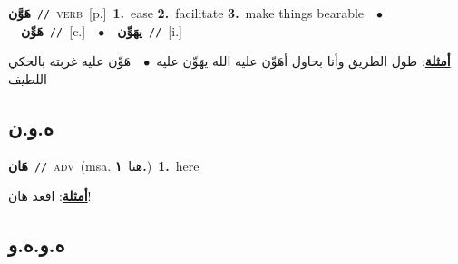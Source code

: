 \documentclass[10pt,a4paper,twoside]{article} %
\begin{document}
\begin{multicols}{2}
{\setlength\topsep{0pt}\textbf{\foreignlanguage{arabic}{هَوَّن}}\ {\color{gray}\texttt{//}\color{black}}\ \textsc{verb}\ [p.]\ \textbf{1.}~ease  \textbf{2.}~facilitate  \textbf{3.}~make things bearable\ \ $\bullet$\ \ \setlength\topsep{0pt}\textbf{\foreignlanguage{arabic}{هَوِّن}}\ {\color{gray}\texttt{//}\color{black}}\ [c.]\ \ $\bullet$\ \ \setlength\topsep{0pt}\textbf{\foreignlanguage{arabic}{يهَوِّن}}\ {\color{gray}\texttt{//}\color{black}}\ [i.]\  \begin{flushright}\color{gray}\foreignlanguage{arabic}{\textbf{\underline{\foreignlanguage{arabic}{أمثلة}}}: طول الطريق وأنا بحاول أهَوِّن عليه الله يهَوِّن عليه\ $\bullet$\ \  هَوِّن عليه غربته بالحكي اللطيف}\end{flushright}\color{black}} \vspace{2mm}

\vspace{-3mm}
\subsection*{\color{blue}\foreignlanguage{arabic}{ه.و.ن}\color{blue}{ (ntws)}} 

{\setlength\topsep{0pt}\textbf{\foreignlanguage{arabic}{هَان}}\ {\color{gray}\texttt{//}\color{black}}\ \textsc{adv}\ \color{gray}(msa. \foreignlanguage{arabic}{هنا}~\foreignlanguage{arabic}{\textbf{١.}})\color{black}\ \textbf{1.}~here\  \begin{flushright}\color{gray}\foreignlanguage{arabic}{\textbf{\underline{\foreignlanguage{arabic}{أمثلة}}}: اقعد هان!}\end{flushright}\color{black}} \vspace{2mm}

\vspace{-3mm}
\subsection*{\color{blue}\foreignlanguage{arabic}{ه.و.ه.و}\color{blue}{}} 


\end{multicols}
\end{document}
